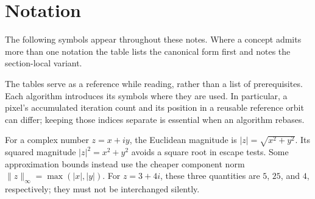 \section{Notation}
\label{sec:notation}

The following symbols appear throughout these notes.  Where a concept
admits more than one notation the table lists the canonical form first
and notes the section-local variant.

The tables serve as a reference while reading, rather than a list of prerequisites.
Each algorithm introduces its symbols where they are used. In particular, a pixel's
accumulated iteration count and its position in a reusable reference orbit can differ;
keeping those indices separate is essential when an algorithm rebases.

For a complex number $z=x+iy$, the Euclidean magnitude is
$|z|=\sqrt{x^2+y^2}$. Its squared magnitude $|z|^2=x^2+y^2$ avoids a square root
in escape tests. Some approximation bounds instead use the cheaper component norm
$\|z\|_\infty=\max(|x|,|y|)$. For $z=3+4i$, these three quantities are $5$, $25$,
and $4$, respectively; they must not be interchanged silently.

